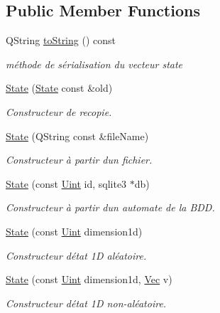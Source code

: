 \subsection*{Public Member Functions}
\begin{DoxyCompactItemize}
\item 
Q\+String \mbox{\hyperlink{class_state_aeadbbdbf52ed603425180ccb53d841cd}{to\+String}} () const
\begin{DoxyCompactList}\small\item\em méthode de sérialisation du vecteur state \end{DoxyCompactList}\item 
\mbox{\hyperlink{class_state_a66c925e564c8e29814ec8519e90fdf90}{State}} (\mbox{\hyperlink{class_state}{State}} const \&old)
\begin{DoxyCompactList}\small\item\em Constructeur de recopie. \end{DoxyCompactList}\item 
\mbox{\hyperlink{class_state_aed4ab30fe127984d9d7f1327abd50976}{State}} (Q\+String const \&file\+Name)
\begin{DoxyCompactList}\small\item\em Constructeur à partir d\textquotesingle{}un fichier. \end{DoxyCompactList}\item 
\mbox{\hyperlink{class_state_a8c645ab945f02b1c90b814ebb67bfcc3}{State}} (const \mbox{\hyperlink{state_8h_a4840c4503b7d10cea5e08416eb3716f1}{Uint}} id, sqlite3 $\ast$db)
\begin{DoxyCompactList}\small\item\em Constructeur à partir d\textquotesingle{}\textquotesingle{}un automate de la B\+DD. \end{DoxyCompactList}\item 
\mbox{\hyperlink{class_state_a647bdb0ebd9012e00ce54400dbb247f0}{State}} (const \mbox{\hyperlink{state_8h_a4840c4503b7d10cea5e08416eb3716f1}{Uint}} dimension1d)
\begin{DoxyCompactList}\small\item\em Constructeur d\textquotesingle{}état 1D aléatoire. \end{DoxyCompactList}\item 
\mbox{\hyperlink{class_state_af599b90d950b89a489ac23a584b1c0e3}{State}} (const \mbox{\hyperlink{state_8h_a4840c4503b7d10cea5e08416eb3716f1}{Uint}} dimension1d, \mbox{\hyperlink{state_8h_aa074fbe250e9d18fbe221bb7473158ad}{Vec}} v)
\begin{DoxyCompactList}\small\item\em Constructeur d\textquotesingle{}état 1D non-\/aléatoire. \end{DoxyCompactList}\item 

\end{DoxyCompactItemize}
